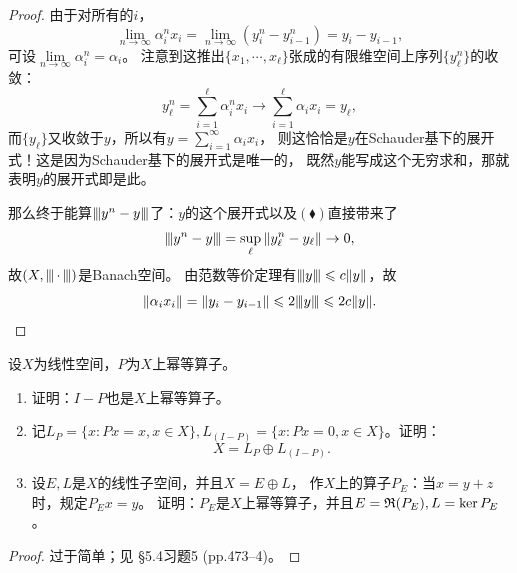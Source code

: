 \begin{proof}
    由于对所有的$i$，\[\lim_{n\to\infty}\alpha_i^nx_i
    =\lim_{n\to\infty}(y^n_i-y^n_{i-1})=y_i-y_{i-1},\]
    可设$\lim\limits_{n\to\infty}\alpha_i^n=\alpha_i$。
    注意到这推出$\{x_1,\cdots,x_\ell\}$张成的有限维空间上序列$\{y^n_\ell\}$的收敛：
    \[y^n_\ell=\sum_{i=1}^\ell\alpha_i^nx_i
    \to\sum_{i=1}^\ell\alpha_ix_i=y_\ell,\]
    而$\{y_\ell\}$又收敛于$y$，所以有$y=\sum\limits_{i=1}^\infty\alpha_ix_i$，
    则这恰恰是$y$在Schauder基下的展开式！这是因为Schauder基下的展开式是唯一的，
    既然$y$能写成这个无穷求和，那就表明$y$的展开式即是此。

    那么终于能算${\left\vert\kern-0.25ex\left\vert\kern-0.25ex\left\vert y^n-y \right\vert\kern-0.25ex\right\vert\kern-0.25ex\right\vert}$了：$y$的这个展开式以及$(\blacklozenge)$直接带来了
    \[{\left\vert\kern-0.25ex\left\vert\kern-0.25ex\left\vert y^n-y \right\vert\kern-0.25ex\right\vert\kern-0.25ex\right\vert}=\sup_{\ell}\|y^n_\ell-y_\ell\|\to0,\]
    故$(X,{\left\vert\kern-0.25ex\left\vert\kern-0.25ex\left\vert \,\cdot\, \right\vert\kern-0.25ex\right\vert\kern-0.25ex\right\vert})$是Banach空间。
    由范数等价定理有${\left\vert\kern-0.25ex\left\vert\kern-0.25ex\left\vert y \right\vert\kern-0.25ex\right\vert\kern-0.25ex\right\vert} \leqslant c\|y\|$，故
    \[\|\alpha_ix_i\|=\|y_i-y_{i-1}\|
    \leqslant2{\left\vert\kern-0.25ex\left\vert\kern-0.25ex\left\vert y \right\vert\kern-0.25ex\right\vert\kern-0.25ex\right\vert}\leqslant2c\|y\|.\qedhere\]
\end{proof}

\begin{9}
    设$X$为线性空间，$P$为$X$上幂等算子。
    \begin{enumerate}[label=(\roman*)]
        \item 证明：$I-P$也是$X$上幂等算子。
        \item 记$L_P=\{x:Px=x,x \in X\},L_{(I-P)}=\{x:Px=0,x \in X\}$。证明：
        \[X=L_P \oplus L_{(I-P)}.\]
        \item 设$E,L$是$X$的线性子空间，并且$X=E \oplus L$，
        作$X$上的算子$P_E$：当$x=y+z$时，规定$P_Ex=y$。
        证明：$P_E$是$X$上幂等算子，并且$E=\mathfrak{R}(P_E),L=\ker P_E$。
    \end{enumerate}
\end{9}
\begin{proof}
    过于简单；见\cite{Xia} \S5.4习题5 (pp.473--4)。
\end{proof}

